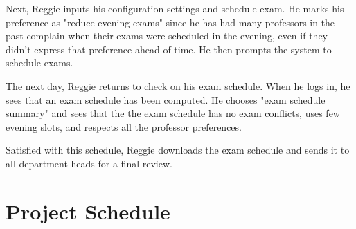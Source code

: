 \documentclass[11pt]{article}
\begin{document}
\begin{description}
Next, Reggie inputs his configuration settings and schedule exam.
He marks his preference as "reduce evening exams" since he has had many professors
in the past complain when their exams were scheduled in the evening, 
even if they didn't express that preference ahead of time. 
He then prompts the system to schedule exams.

The next day, Reggie returns to check on his exam schedule. 
When he logs in, he sees that an exam schedule has been computed. 
He chooses "exam schedule summary" and sees that
the the exam schedule has no exam conflicts, uses few evening slots, 
and respects all the professor preferences. 

Satisfied with this schedule, Reggie downloads the exam schedule 
 and sends it to all department heads for a final review.


\end{description}

\section{Project Schedule} %
\end{document}
